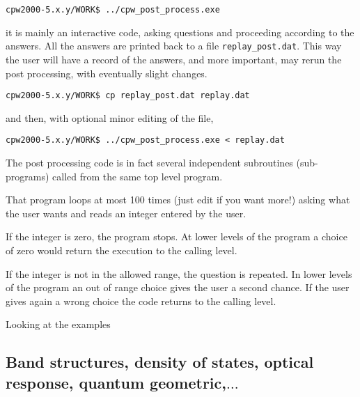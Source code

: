 \documentclass[11pt]{article}
\begin{document}
\noindent\texttt{cpw2000-5.x.y/WORK\$  ../cpw\_post\_process.exe}

it is mainly an interactive code, asking questions and proceeding according to the answers.
All the answers are printed back to a file \texttt{replay\_post.dat}.
This way the user will have a record of the answers, and more important,
may rerun the post processing, with eventually slight changes.

\noindent\texttt{cpw2000-5.x.y/WORK\$  cp replay\_post.dat replay.dat}

and then, with optional minor editing of the file,

\noindent\texttt{cpw2000-5.x.y/WORK\$  ../cpw\_post\_process.exe < replay.dat}

The post processing code is in fact several independent subroutines (sub-programs) called from the
same top level program.

That program loops at most 100 times (just edit if you want more!)
asking what the user wants and reads an integer entered by the user.

If the integer is zero, the program stops.  At lower levels of the program a choice of
zero would return the execution to the calling level.

If the integer is not in the allowed range, the question is repeated.
In lower levels of the program an out of range choice gives the user a second chance.
If the user gives again a wrong choice the code returns to the calling level.

Looking at the examples


\subsection{Band structures, density of states, optical response, quantum geometric,$\ldots$}
\end{document}
